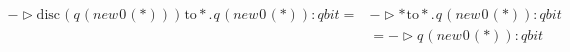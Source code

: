 \begin{equation}
  \begin{split}
  - \triangleright \text{disc} \hspace{1pt} (q \hspace{1pt} (\textit{new}\hspace{1pt}0 \hspace{1pt}(*))) \hspace{1pt} \text{to} *. \hspace{1pt} q \hspace{1pt} (\textit{new}\hspace{1pt}0 \hspace{1pt}(*)): \textit{qbit} =& - \triangleright * \hspace{1pt} \text{to} *. \hspace{1pt} q \hspace{1pt} (\textit{new}\hspace{1pt}0 \hspace{1pt}(*)): \textit{qbit}\\
  & = - \triangleright q \hspace{1pt} (\textit{new}\hspace{1pt}0 \hspace{1pt}(*)): \textit{qbit} 
\end{split}
\end{equation}
